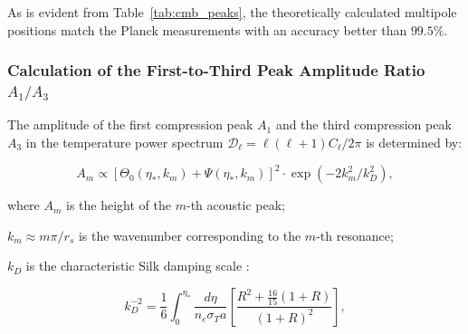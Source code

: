 \begin{table}[htbp]
\centering
\caption{Comparison of theoretical acoustic peak positions with Planck 2018 data.}\label{tab:cmb_peaks}
\end{table}

As is evident from Table~\ref{tab:cmb_peaks}, the theoretically calculated multipole positions match the Planck measurements with an accuracy better than $99.5\%$.


\subsubsection{Calculation of the First-to-Third Peak Amplitude Ratio $A_1 / A_3$}\label{sec:4.4.4}

The amplitude of the first compression peak $A_1$ and the third compression peak $A_3$ in the temperature power spectrum $\mathcal{D}_\ell = \ell(\ell+1)C_\ell / 2\pi$ is determined by:

\begin{equation}\label{eq:4.66}\tag{4.66}
A_m \propto \left[ \Theta_0(\eta_*, k_m) + \Psi(\eta_*, k_m) \right]^2 \cdot \exp\left( - 2 k_m^2 / k_D^2 \right),
\end{equation}

where $A_m$ is the height of the $m$-th acoustic peak;  

$k_m \approx m \pi / r_s$ is the wavenumber corresponding to the $m$-th resonance;  

$k_D$ is the characteristic Silk damping scale \cite{ref36}:

\begin{equation}\label{eq:4.67}\tag{4.67}
k_D^{-2} = \frac{1}{6} \int_0^{\eta_*} \frac{d\eta}{n_e \sigma_T a} \left[ \frac{R^2 + \frac{16}{15}(1+R)}{(1+R)^2} \right],
\end{equation}

